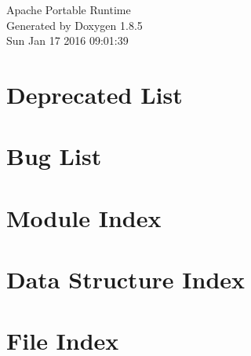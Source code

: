\documentclass[twoside]{book}
\newcommand{\clearemptydoublepage}{%
  \newpage{\pagestyle{empty}\cleardoublepage}%
}
\begin{document}
\hypersetup{pageanchor=false}
\begin{titlepage}
\vspace*{7cm}
\begin{center}%
{\Large Apache Portable Runtime }\\
\vspace*{1cm}
{\large Generated by Doxygen 1.8.5}\\
\vspace*{0.5cm}
{\small Sun Jan 17 2016 09:01:39}\\
\end{center}
\end{titlepage}
\clearemptydoublepage
\tableofcontents
\clearemptydoublepage
{}
\hypersetup{pageanchor=true}

\chapter{Deprecated List}
\label{deprecated}
\hypertarget{deprecated}{}

\chapter{Bug List}
\label{bug}
\hypertarget{bug}{}

\chapter{Module Index}

\chapter{Data Structure Index}

\chapter{File Index}

\end{document}
